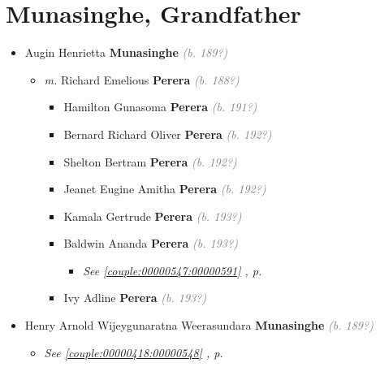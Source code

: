 \documentclass[10pt, openany]{book}
\begin{document}
\chapter{Munasinghe, Grandfather}
\label{00000545}
\textcolor{slmaroon}{\textit{}}
\begin{itemize}
\item{Augin Henrietta \textbf{Munasinghe} \textcolor{gray}{\textit{(b. 189?)}}
\begin{itemize}
\item{\textit{m.} Richard Emelious \textbf{Perera} \textcolor{gray}{\textit{(b. 188?)}}   \label{couple:00000544:00000608} \begin{itemize}
\item{Hamilton Gunasoma \textbf{Perera} \textcolor{gray}{\textit{(b. 191?)}}
  }
\item{Bernard Richard Oliver \textbf{Perera} \textcolor{gray}{\textit{(b. 192?)}}
   }
\item{Shelton Bertram \textbf{Perera} \textcolor{gray}{\textit{(b. 192?)}}
  }
\item{Jeanet Eugine Amitha \textbf{Perera} \textcolor{gray}{\textit{(b. 192?)}}
   }
\item{Kamala Gertrude \textbf{Perera} \textcolor{gray}{\textit{(b. 193?)}}
  }
\item{Baldwin Ananda \textbf{Perera} \textcolor{gray}{\textit{(b. 193?)}}
\begin{itemize}
\item{\textcolor{slteal}{\textit{See  \autoref{couple:00000547:00000591} \textit{, p. \pageref{couple:00000547:00000591} }}}}
\end{itemize}
  }
\item{Ivy Adline \textbf{Perera} \textcolor{gray}{\textit{(b. 193?)}}
  }
\end{itemize}}
\end{itemize}
  }
\item{Henry Arnold Wijeygunaratna Weerasundara \textbf{Munasinghe} \textcolor{gray}{\textit{(b. 189?)}}
\begin{itemize}
\item{\textcolor{slteal}{\textit{See  \autoref{couple:00000418:00000548} \textit{, p. \pageref{couple:00000418:00000548} }}}}
\end{itemize}
    }
\end{itemize}
 
\end{document}
